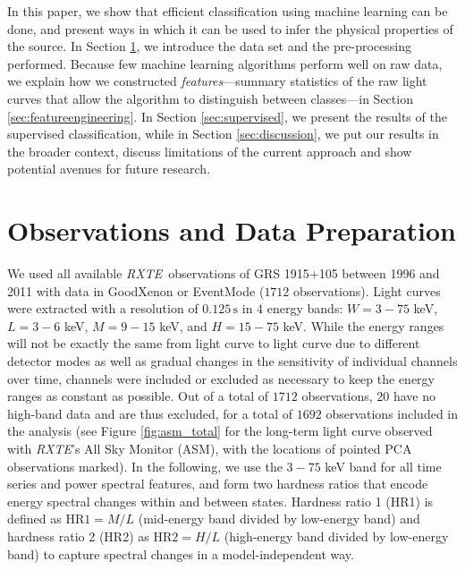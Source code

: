 \documentclass[fleqn,usenatbib]{mnras}
\newcommand{\project}[1]{\textsl{#1}}
\newcommand{\rxte}{\project{RXTE}}
\begin{document}
In this paper, we show that efficient classification using machine learning can be done, and present ways in which it can be used to infer the physical properties of the source. In Section \ref{sec:observations}, we introduce the data set and the pre-processing performed. Because few machine learning algorithms perform well on raw data, we explain how we constructed \textit{features}---summary statistics of the raw light curves that allow the algorithm to distinguish between classes---in Section \ref{sec:featureengineering}. In Section \ref{sec:supervised}, we present the results of the supervised classification, while in Section \ref{sec:discussion}, we put our 
results in the broader context, discuss limitations of the current approach and show potential avenues for future research.

\section{Observations and Data Preparation}
\label{sec:observations}

We used all available \rxte\ observations of GRS 1915+105 between 1996 and 2011 with data in GoodXenon or EventMode ($1712$ observations). Light curves were extracted with a resolution of $0.125\,\mathrm{s}$ in $4$ energy bands: $W = 3 - 75$ keV, $L = 3 - 6$ keV, $M = 9 - 15$ keV, and $H = 15 - 75$ keV. While the energy ranges will not be exactly the same from light curve to light curve due to different detector modes as well as gradual changes in the sensitivity of individual channels over time, channels were included or excluded as necessary to keep the energy ranges as constant as possible. Out of a total of $1712$ observations, $20$ have no high-band data and are thus excluded, for a total of $1692$ observations included in the analysis (see Figure \ref{fig:asm_total} for the long-term light curve observed with \rxte's All Sky Monitor (ASM), with the locations of pointed PCA observations marked). 
In the following, we use the $3 - 75$ keV band for all time series and power spectral features, and form two hardness ratios that encode energy spectral changes within and between states. Hardness ratio 1 (HR1) is defined as $\mathrm{HR}1 = M/L$ (mid-energy band divided by low-energy band) and hardness ratio 2 (HR2) as $\mathrm{HR}2 = H/L$ (high-energy band divided by low-energy band) to capture spectral changes in a model-independent way.

\end{document}
